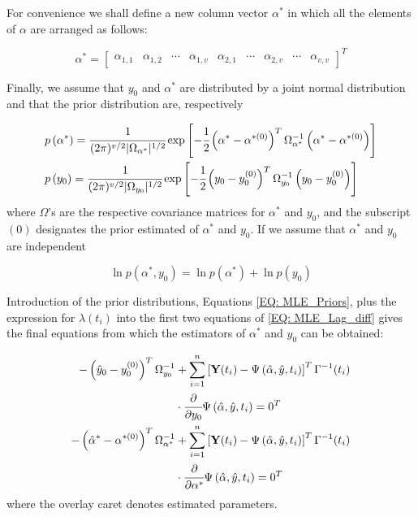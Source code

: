 \documentclass[a4paper,fleqn]{cas-dc}
\begin{document}
For convenience we shall define a new column vector $\alpha^*$ in which all the elements of $\alpha$ are arranged as follows:

\begin{equation}
	\alpha^* = \begin{bmatrix}
		\alpha_{1,1} & \alpha_{1,2} & \cdots & \alpha_{1,v} & \alpha_{2,1} & \cdots & \alpha_{2,v} & \cdots & \alpha_{v,v}
	\end{bmatrix}^T	
\end{equation}

Finally, we assume that $y_0$ and $\alpha^*$ are distributed by a joint normal distribution and that the prior  distribution are, respectively

\begin{subequations} \label{EQ: MLE_Priors}
	\begin{align}
		&p\left( \alpha^* \right) = \cfrac{1}{ (2\pi)^{v/2} |\Omega_{\alpha^*}|^{1/2} } \exp \left[ -\cfrac{1}{2} \left( \alpha^* - \alpha^{*(0)} \right)^T \Omega_{\alpha^*}^{-1} \left( \alpha^* - \alpha^{*(0)} \right) \right] \\
		&p\left( y_0 \right) = \cfrac{1}{ (2\pi)^{v/2} |\Omega_{y_0}|^{1/2} } \exp \left[ -\cfrac{1}{2} \left( y_0 - y_0^{(0)} \right)^T \Omega_{y_0}^{-1} \left( y_0 - y_0^{(0)} \right) \right] 
	\end{align}
\end{subequations}
where $\Omega$'s are the respective covariance matrices for $\alpha^*$ and $y_0$, and the subscript $(0)$ designates the prior estimated of $\alpha^*$ and $y_0$. If we assume that $\alpha^*$ and $y_0$ are independent

\begin{equation}
	\ln p(\alpha^*,y_0) = \ln p(\alpha^*) + \ln p(y_0)
\end{equation}

Introduction of the prior distributions, Equations \ref{EQ: MLE_Priors}, plus the expression for $\lambda(t_i)$ into the first two equations of \ref{EQ: MLE_Lag_diff} gives the final equations from which the estimators of $\alpha^*$ and $y_0$ can be obtained:

\begin{subequations} 
	\begin{align}
	-\left( \hat{y}_0 - y_0^{(0)} \right)^T \Omega_{y_0}^{-1} &+ \sum_{i=1}^{n}\left[ \textbf{Y}(t_i) - \Psi\left( \hat{\alpha}, \hat{y}, t_i \right) \right]^T \Gamma^{-1}(t_i) \nonumber \\ 
	&\cdot \cfrac{\partial}{\partial y_0} \Psi\left( \hat{\alpha}, \hat{y}, t_i \right) = 0^T \\
	-\left( \hat{\alpha}^* - \alpha^{*(0)} \right)^T \Omega_{\alpha^*}^{-1} &+ \sum_{i=1}^{n}\left[ \textbf{Y}(t_i) - \Psi\left( \hat{\alpha}, \hat{y}, t_i \right) \right]^T \Gamma^{-1}(t_i) \nonumber \\ 
	&\cdot \cfrac{\partial}{\partial \alpha^*} \Psi\left( \hat{\alpha}, \hat{y}, t_i \right) = 0^T \nonumber \\
	\end{align}
\end{subequations}
where the overlay caret denotes estimated parameters.
\end{document}
